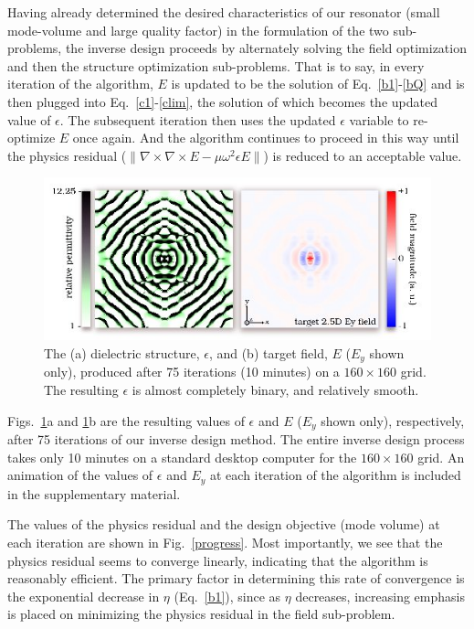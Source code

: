 Having already determined the desired characteristics of our resonator (small mode-volume and large quality factor) in the formulation of the two sub-problems, the inverse design proceeds by alternately solving the field optimization and then the structure optimization sub-problems. That is to say, in every iteration of the algorithm, $E$ is updated to be the solution of Eq.~\ref{b1}-\ref{bQ} and is then plugged into Eq.~\ref{c1}-\ref{clim}, the solution of which becomes the updated value of $\epsilon$. The subsequent iteration then uses the updated $\epsilon$ variable to re-optimize $E$ once again. And the algorithm continues to proceed in this way until the physics residual ($\|\nabla\times\nabla\times E - \mu\omega^2\epsilon E\|$) is reduced to an acceptable value.

\begin{figure}[hbt]
\centering\includegraphics[width=\textwidth]{p2/target}
\caption{The (a) dielectric structure, $\epsilon$, and (b) target field, $E$ ($E_y$ shown only), produced after 75 iterations (10 minutes) on a $160\times 160$ grid. The resulting $\epsilon$ is almost completely binary, and relatively smooth.}\label{target}
\end{figure}
Figs.~\ref{target}a and \ref{target}b are the resulting values of $\epsilon$ and $E$ ($E_y$ shown only), respectively, after 75 iterations of our inverse design method. The entire inverse design process takes only 10 minutes on a standard desktop computer for the $160 \times 160$ grid. An animation of the values of $\epsilon$ and $E_y$ at each iteration of the algorithm is included in the supplementary material.  

The values of the physics residual and the design objective (mode volume) at each iteration are shown in Fig.~\ref{progress}. Most importantly, we see that the physics residual seems to converge linearly, indicating that the algorithm is reasonably efficient. The primary factor in determining this rate of convergence is the exponential decrease in $\eta$ (Eq.~\ref{b1}), since as $\eta$ decreases, increasing emphasis is placed on minimizing the physics residual in the field sub-problem. 

